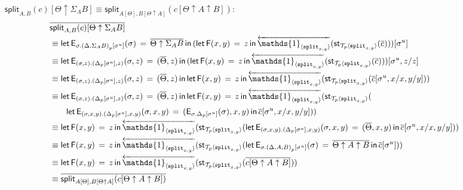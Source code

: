\documentclass[10pt]{article}
\theoremstyle{definition}
\newcommand{\rewrite}[2]{\overleftarrow{#1}(#2)}
\newcommand\StI[2]{\ensuremath{\mathsf{st}_{#1}(#2)}}
\newcommand\FE[3]{\ensuremath{\mathsf{let} \, \mathsf{F}(#2) \, = \, {#1} \, \mathsf{in} \, #3}}
\newcommand\EEs[4]{\ensuremath{\mathsf{let} \, \mathsf{E}_{#1}(#3) \, = \, {#2} \, \mathsf{in} \, #4}}
\newcommand\EIs[2]{\ensuremath{\mathsf{E}_{#1}{(#2)}}}
\newcommand\ApEl[2]{\mathcal{T}_{#1}\langle#2\rangle}
\newcommand\unp[2]{\ensuremath{{#2}^u}}
\newcommand{\modeof}[1]{{#1}_p}
\newcommand{\upstairs}[1]{\overline{#1}}
\newcommand\One{\ensuremath{\mathds{1}}}
\newcommand\ApOne[1]{\ensuremath{\One_{\langle {#1} \rangle }}}
\newcommand\tsplit[1]{\ensuremath{\mathtt{split}_{#1}}}
\newcommand\qsplit[1]{\ensuremath{\mathsf{split}_{#1}}}
\begin{document}
\begin{enumerate}[style = multiline, labelwidth = 80pt]
\item[{$\qsplit{A,B}(c)[\Theta \uparrow \Sigma_A B] \equiv \qsplit{A[\Theta],B[\Theta \uparrow A]}(c[\Theta \uparrow A \uparrow B])$}:]
\begin{align*}
&\upstairs{\qsplit{A,B}(c)[\Theta \uparrow \Sigma_A B]} \\
&\equiv \EEs{\sigma. \modeof{(\Delta, \Sigma_A B)}[\unp{\Delta, \Sigma_A B}{\sigma}]}{\upstairs{\Theta \uparrow \Sigma_A B}}{\sigma}{(\FE{z}{x,y}{\rewrite{\ApOne{\tsplit{x,y}}}{\StI{\ApEl{p}{\tsplit{x,y}}}{\upstairs{c}}}})[\unp{\Delta, \Sigma_A B}{\sigma}]} \\
&\equiv \EEs{(\sigma, z).(\modeof{\Delta}[\unp{\delta}{\sigma}], z)}{(\upstairs{\Theta}, z)}{\sigma, z}{(\FE{z}{x,y}{\rewrite{\ApOne{\tsplit{x,y}}}{\StI{\ApEl{p}{\tsplit{x,y}}}{\upstairs{c}}}})[\unp{\Delta}{\sigma}, z/z]} \\
&\equiv \EEs{(\sigma, z).(\modeof{\Delta}[\unp{\delta}{\sigma}], z)}{(\upstairs{\Theta}, z)}{\sigma, z}{\FE{z}{x,y}{\rewrite{\ApOne{\tsplit{x,y}}}{\StI{\ApEl{p}{\tsplit{x,y}}}{\upstairs{c}[\unp{\Delta}{\sigma}, x/x, y/y]}}}} \\
&\equiv \EEs{(\sigma, z).(\modeof{\Delta}[\unp{\delta}{\sigma}], z)}{(\upstairs{\Theta}, z)}{\sigma, z}{\FE{z}{x,y}{\rewrite{\ApOne{\tsplit{x,y}}}{\StI{\ApEl{p}{\tsplit{x,y}}}{\\&\qquad \EEs{(\sigma, x, y). (\modeof{\Delta}[\unp{\Delta}{\sigma}], x, y)}{(\EIs{\sigma.\modeof{\Delta}[\unp{\Delta}{\sigma}]}{\sigma},x, y)}{\sigma,x,y}{\upstairs{c}[\unp{\Delta}{\sigma}, x/x, y/y]}}}}} \\
&\equiv \FE{z}{x,y}{\rewrite{\ApOne{\tsplit{x,y}}}{\StI{\ApEl{p}{\tsplit{x,y}}}{\EEs{(\sigma, x, y). (\modeof{\Delta}[\unp{\Delta}{\sigma}], x, y)}{(\upstairs{\Theta}, x, y)}{\sigma,x,y}{\upstairs{c}[\unp{\Delta}{\sigma}, x/x, y/y]}}}} \\
&\equiv \FE{z}{x,y}{\rewrite{\ApOne{\tsplit{x,y}}}{\StI{\ApEl{p}{\tsplit{x,y}}}{\EEs{\sigma.\modeof{(\Delta, A, B)}[\unp{\Delta, A, B}{\sigma}]}{\upstairs{\Theta \uparrow A \uparrow B}}{\sigma}{\upstairs{c}[\unp{\Delta, A, B}{\sigma}]}}}} \\
&\equiv \FE{z}{x,y}{\rewrite{\ApOne{\tsplit{x,y}}}{\StI{\ApEl{p}{\tsplit{x,y}}}{\upstairs{c[\Theta \uparrow A \uparrow B]}}}} \\
&\equiv \upstairs{\qsplit{A[\Theta],B[\Theta \uparrow A]}(c[\Theta \uparrow A \uparrow B])}
\end{align*}


\end{enumerate}
\end{document}
